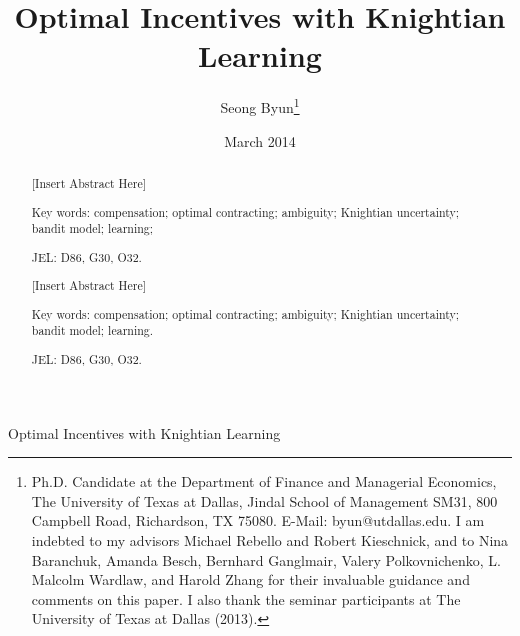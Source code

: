 \documentclass[11pt]{article} %
\theoremstyle{exampstyle}
\begin{document}
\setlength{\parindent}{0pt}
\setlength{\parskip}{10pt} 

\title{Optimal Incentives with Knightian Learning}

\author{Seong Byun\thanks{
Ph.D. Candidate at the Department of Finance and Managerial Economics, The University of Texas at
Dallas, Jindal School of Management SM31, 800 Campbell Road, Richardson, TX
75080. E-Mail: byun@utdallas.edu. I am indebted to my advisors Michael Rebello and Robert Kieschnick, and to Nina Baranchuk, Amanda Besch, Bernhard Ganglmair, Valery Polkovnichenko, L. Malcolm Wardlaw, and Harold Zhang for their invaluable guidance and comments on this paper. I also thank the seminar participants at The University of Texas at Dallas (2013).}}

\date{March 2014}
\maketitle

\begin{abstract}
[Insert Abstract Here]

Key words: compensation; optimal contracting; ambiguity; Knightian uncertainty; bandit model; learning;

JEL: D86, G30, O32.

\end{abstract}

\thispagestyle{empty}
\clearpage
\setcounter{page}{1}


\begin{center}
\Large{Optimal Incentives with Knightian Learning}
\end{center}

\vspace{.5in}



\begin{abstract}
[Insert Abstract Here]

Key words: compensation; optimal contracting; ambiguity; Knightian uncertainty; bandit model; learning.

JEL: D86, G30, O32.

\end{abstract}



\thispagestyle{empty}
\clearpage
\setcounter{page}{1}
\end{document}
